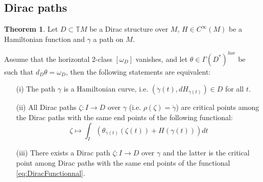 \documentclass[a4paper,12pt]{amsart}
\theoremstyle{definition}
\newtheorem{Theorem}[Definition]{Theorem}
\begin{document}
\subsection{Dirac paths}


\begin{Theorem} \label{thm1}
Let $D \subset \mathbb TM$ be a Dirac structure over $M$, 
$H\in C^\infty(M)$ be a Hamiltonian function and $\gamma$ a path on $M.$ 

Assume that the {horizontal} 2-class $[\omega_D]$ vanishes, and let $\theta\in \Gamma(D^*)^{hor}$ be such that $d_D\theta=\omega_D$, then the following statements are equivalent:
\begin{itemize}
    \item[(i)] The path $\gamma$ is a Hamiltonian curve, i.e. $(\dot \gamma(t), dH_{\gamma(t)})\in D$ for all $t$. 
    \item[(ii)] 
    All Dirac paths $\zeta:I\to D$ over $\gamma$ (i.e. $\rho(\zeta)=\dot \gamma$) 
    are critical points among the Dirac paths with the same end points  
     of the following functional:
    \begin{equation}
    \zeta\mapsto \int_I\left(\theta_{\gamma(t)}(\zeta(t))+H(\gamma(t))\right)dt
    \label{eq:DiracFunctionnal}
    \end{equation}
     \item[(iii)] There exists a Dirac path $\zeta:I\to D$ over $\gamma$ and the latter is the critical point among Dirac paths with the same end points of the functional \eqref{eq:DiracFunctionnal}.
\end{itemize}
 
\end{Theorem}
\end{document}
